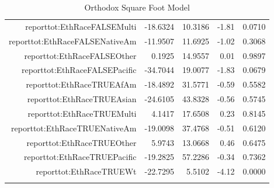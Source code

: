 \documentclass{article}
\begin{document}
\begin{longtable}{rrrrr}
$$  reporttot:EthRaceFALSEMulti & -18.6324 & 10.3186 & -1.81 & 0.0710 \\ 
  reporttot:EthRaceFALSENativeAm & -11.9507 & 11.6925 & -1.02 & 0.3068 \\ 
  reporttot:EthRaceFALSEOther & 0.1925 & 14.9557 & 0.01 & 0.9897 \\ 
  reporttot:EthRaceFALSEPacific & -34.7044 & 19.0077 & -1.83 & 0.0679 \\ 
  reporttot:EthRaceTRUEAfAm & -18.4892 & 31.5771 & -0.59 & 0.5582 \\ 
  reporttot:EthRaceTRUEAsian & -24.6105 & 43.8328 & -0.56 & 0.5745 \\ 
  reporttot:EthRaceTRUEMulti & 4.1417 & 17.6508 & 0.23 & 0.8145 \\ 
  reporttot:EthRaceTRUENativeAm & -19.0098 & 37.4768 & -0.51 & 0.6120 \\ 
  reporttot:EthRaceTRUEOther & 5.9743 & 13.0668 & 0.46 & 0.6475 \\ 
  reporttot:EthRaceTRUEPacific & -19.2825 & 57.2286 & -0.34 & 0.7362 \\ 
  reporttot:EthRaceTRUEWt & -22.7295 & 5.5102 & -4.12 & 0.0000 \\ 
   \hline
\hline
\caption{Orthodox Square Foot Model} 
\label{tab:OrthoSQFT}
\end{longtable}
\end{document}
